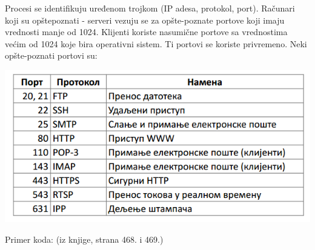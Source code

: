 \documentclass{article} %
\begin{document}
Procesi se identifikuju uređenom trojkom (IP adesa, protokol, port).
Računari koji su opštepoznati - serveri vezuju se za opšte-poznate portove koji imaju vrednosti manje od 1024. Klijenti koriste nasumične portove sa vrednostima većim od 1024 koje bira operativni sistem. Ti portovi se koriste privremeno. Neki opšte-poznati portovi su:
\begin{center}
	\includegraphics[scale=0.5]{portovi}
\end{center}
Primer koda: (iz knjige, strana 468. i 469.)
\end{document}
